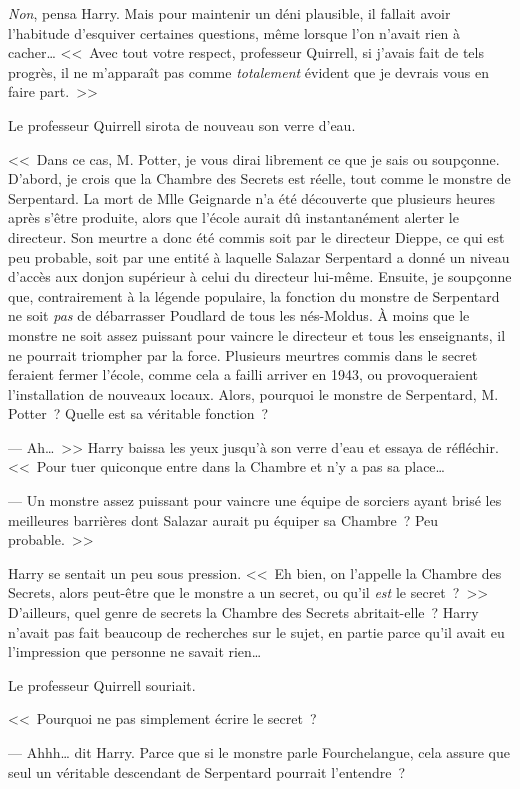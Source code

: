 \emph{Non}, pensa Harry. Mais pour maintenir un déni plausible, il fallait avoir l'habitude d'esquiver certaines questions, même lorsque l'on n'avait rien à cacher… <<~Avec tout votre respect, professeur Quirrell, si j'avais fait de tels progrès, il ne m'apparaît pas comme \emph{totalement} évident que je devrais vous en faire part.~>>

Le professeur Quirrell sirota de nouveau son verre d'eau.

<<~Dans ce cas, M. Potter, je vous dirai librement ce que je sais ou soupçonne. D'abord, je crois que la Chambre des Secrets est réelle, tout comme le monstre de Serpentard. La mort de Mlle Geignarde n'a été découverte que plusieurs heures après s'être produite, alors que l'école aurait dû instantanément alerter le directeur. Son meurtre a donc été commis soit par le directeur Dieppe, ce qui est peu probable, soit par une entité à laquelle Salazar Serpentard a donné un niveau d'accès aux donjon supérieur à celui du directeur lui-même. Ensuite, je soupçonne que, contrairement à la légende populaire, la fonction du monstre de Serpentard ne soit \emph{pas} de débarrasser Poudlard de tous les nés-Moldus. À moins que le monstre ne soit assez puissant pour vaincre le directeur et tous les enseignants, il ne pourrait triompher par la force. Plusieurs meurtres commis dans le secret feraient fermer l'école, comme cela a failli arriver en 1943, ou provoqueraient l'installation de nouveaux locaux. Alors, pourquoi le monstre de Serpentard, M. Potter~? Quelle est sa véritable fonction~?

--- Ah…~>> Harry baissa les yeux jusqu'à son verre d'eau et essaya de réfléchir. <<~Pour tuer quiconque entre dans la Chambre et n'y a pas sa place…

--- Un monstre assez puissant pour vaincre une équipe de sorciers ayant brisé les meilleures barrières dont Salazar aurait pu équiper sa Chambre~? Peu probable.~>>

Harry se sentait un peu sous pression. <<~Eh bien, on l'appelle la Chambre des Secrets, alors peut-être que le monstre a un secret, ou qu'il \emph{est} le secret~?~>> D'ailleurs, quel genre de secrets la Chambre des Secrets abritait-elle~? Harry n'avait pas fait beaucoup de recherches sur le sujet, en partie parce qu'il avait eu l'impression que personne ne savait rien…

Le professeur Quirrell souriait.

<<~Pourquoi ne pas simplement écrire le secret~?

--- Ahhh… dit Harry. Parce que si le monstre parle Fourchelangue, cela assure que seul un véritable descendant de Serpentard pourrait l'entendre~?


